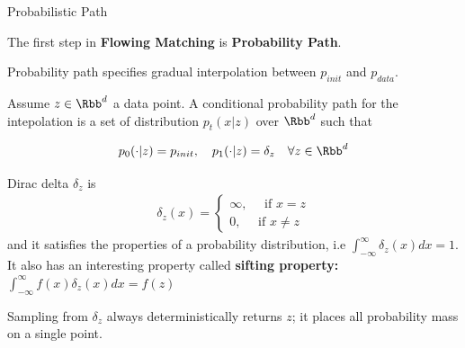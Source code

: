 \documentclass[aspectratio=169,xcolor=dvipsnames,svgnames,x11names,fleqn]{beamer}
\begin{document}
\begin{frame}{Probabilistic Path}

    \footnotesize

    The first step in \textbf{Flowing Matching} is \textbf{Probability Path}.

    \vspace{5pt}

        \begin{tcolorbox}[enhanced, sharp corners,
    boxrule=0.0pt, 
    leftrule = 2mm,
    colframe=white!80!red, colback=dustyGreen!20,
    notitle,
    left=1mm ]

    Probability path specifies gradual interpolation between $p_{init}$ and $p_{data}$.

    \end{tcolorbox}

    Assume $z\in \Rbb^d$ a data point. A conditional probability path for the intepolation is a set of distribution $p_t(x|z)$ over $\Rbb^d$ such that

    $$
    p_0(\cdot | z) = p_{init}, \quad p_1(\cdot | z) = \delta_z \quad \forall z \in \Rbb^d
    $$
    
    \vspace{5pt}

        \begin{tcolorbox}[enhanced, sharp corners,
    boxrule=0.0pt, 
    leftrule = 2mm,
    colframe=white!80!red, colback=androidRed!20,
    notitle,
    left=1mm ]

    Dirac delta $\delta_z$ is \begin{align*}
        \delta_z(x) = \begin{cases}
            \infty, \quad \text{~if~} x = z\\
            0, \quad \text{~if~} x \neq z
        \end{cases}
    \end{align*}
    and it satisfies the properties of a probability distribution, i.e $\int_{-\infty}^\infty \delta_z(x)dx =  1 $. It also has an interesting property called \textbf{sifting property:} $\int_{-\infty}^\infty f(x)\delta_z(x)dx =  f(z) $

    {\color{blue}Sampling from $\delta_z$ always deterministically returns $z$; it places all probability mass on a single point.}
        \end{tcolorbox}
\end{frame}
\end{document}
